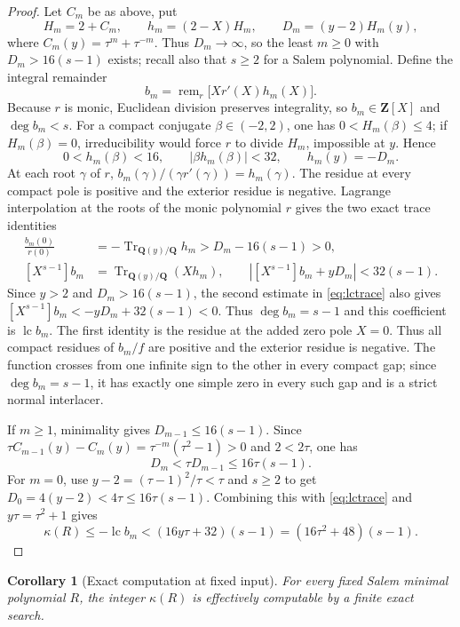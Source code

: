 \documentclass[11pt,reqno]{amsart}
\newtheorem{corollary}[theorem]{Corollary}
\theoremstyle{definition}
\theoremstyle{remark}
\newcommand{\Q}{\mathbf Q}
\newcommand{\Z}{\mathbf Z}
\begin{document}
\begin{proof}
Let $C_m$ be as above, put
\[
 H_m=2+C_m,\qquad h_m=(2-X)H_m,\qquad
 D_m=(y-2)H_m(y),
\]
where $C_m(y)=\tau^m+\tau^{-m}$.  Thus $D_m\to\infty$, so the least
$m\ge0$ with $D_m>16(s-1)$ exists; recall also that $s\ge2$ for a Salem
polynomial.  Define the integral
remainder
\begin{equation}\label{eq:bm}
 b_m=\operatorname{rem}_{r}\bigl[Xr'(X)h_m(X)\bigr].
\end{equation}
Because $r$ is monic, Euclidean division preserves integrality, so
$b_m\in\Z[X]$ and $\deg b_m<s$.
For a compact conjugate $\beta\in(-2,2)$, one has
$0<H_m(\beta)\le4$; if $H_m(\beta)=0$, irreducibility would force $r$ to
divide $H_m$, impossible at $y$.  Hence
\[
 0<h_m(\beta)<16,\qquad |\beta h_m(\beta)|<32,\qquad h_m(y)=-D_m.
\]
At each root $\gamma$ of $r$,
$b_m(\gamma)/(\gamma r'(\gamma))=h_m(\gamma)$.  The residue at every compact
pole is positive and the exterior residue is negative.  Lagrange
interpolation at the roots of the monic polynomial $r$ gives the two exact
trace identities
\begin{align}
 \frac{b_m(0)}{r(0)}
 &=-\operatorname{Tr}_{\Q(y)/\Q}h_m
   >D_m-16(s-1)>0,\label{eq:zeropoletrace}\\
 [X^{s-1}]b_m
 &=\operatorname{Tr}_{\Q(y)/\Q}(Xh_m),\qquad
 \left|[X^{s-1}]b_m+yD_m\right|<32(s-1).
 \label{eq:lctrace}
\end{align}
Since $y>2$ and $D_m>16(s-1)$, the second estimate in
\eqref{eq:lctrace} also gives
$[X^{s-1}]b_m<-yD_m+32(s-1)<0$.  Thus $\deg b_m=s-1$ and this
coefficient is $\operatorname{lc}b_m$.
The first identity is the residue at the added zero pole $X=0$.  Thus all
compact residues of $b_m/f$ are positive and the exterior residue is
negative.  The function crosses from one infinite sign to the other in every
compact gap; since $\deg b_m=s-1$, it has exactly one simple zero in every
such gap and is a strict normal interlacer.

If $m\ge1$, minimality gives $D_{m-1}\le16(s-1)$.  Since
$\tau C_{m-1}(y)-C_m(y)=\tau^{-m}(\tau^2-1)>0$ and $2<2\tau$,
one has
\[
 D_m<\tau D_{m-1}\le16\tau(s-1).
\]
For $m=0$, use $y-2=(\tau-1)^2/\tau<\tau$ and $s\ge2$ to get
$D_0=4(y-2)<4\tau\le16\tau(s-1)$.  Combining this with
\eqref{eq:lctrace} and $y\tau=\tau^2+1$ gives
\[
 \kappa(R)\le-\operatorname{lc}b_m
 <(16y\tau+32)(s-1)=(16\tau^2+48)(s-1).
\]
\end{proof}

\begin{corollary}[Exact computation at fixed input]
\label{cor:kappacomputable}
For every fixed Salem minimal polynomial $R$, the integer $\kappa(R)$ is
effectively computable by a finite exact search.
\end{corollary}
\end{document}
